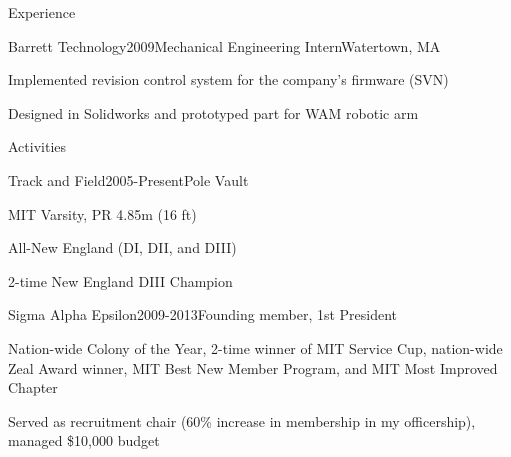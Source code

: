 \documentclass{resume}
\begin{document}
\begin{rSection}{Experience}

\begin{rSubsection}{Barrett Technology}{2009}{Mechanical Engineering Intern}{Watertown, MA}
\item Implemented revision control system for the company's firmware (SVN)
\item Designed in Solidworks and prototyped part for WAM robotic arm
\end{rSubsection}


\end{rSection}

\begin{rSection}{Activities}
\begin{rSubsection}{Track and Field}{2005-Present}{Pole Vault}{}
\item MIT Varsity, PR 4.85m (16 ft)
\item All-New England (DI, DII, and DIII)
\item 2-time New England DIII Champion
\end{rSubsection}

\begin{rSubsection}{Sigma Alpha Epsilon}{2009-2013}{Founding member, 1st President}{}
\item Nation-­wide Colony of the Year, 2-­time winner of MIT Service Cup, nation-wide Zeal Award winner, MIT Best New Member Program, and MIT Most Improved Chapter
\item Served as recruitment chair (60\% increase in membership in my officership), managed \$10,000 budget

\end{rSubsection}
\end{rSection}
\end{document}

